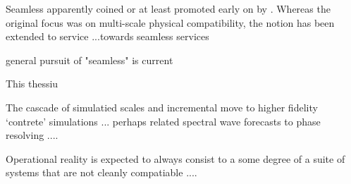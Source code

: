 Seamless apparently coined or at least promoted early on by \citet{10.1175/bams-89-4-459}.
Whereas the original focus was on multi-scale physical compatibility, the notion has been extended to service ...towards seamless services \cite{BOM2020}

general pursuit of "seamless" is current \cite{10.1127/metz/2020/1048}



This thessiu 

The cascade of simulatied scales and incremental move to higher fidelity `contrete' simulations  ...
perhaps related spectral wave forecasts to phase resolving ....


Operational reality is expected to always consist to a some degree of a suite of systems that are not cleanly compatiable ....




